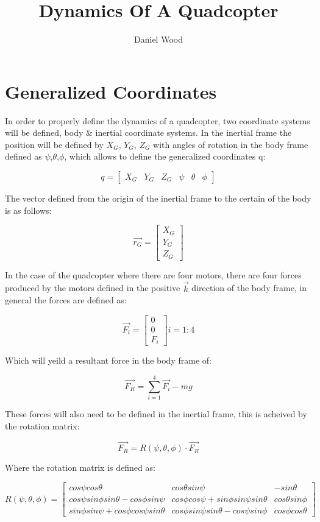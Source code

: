 \documentclass[10pt, letterpaper]{article}
\begin{document}
\title{Dynamics Of A Quadcopter}
\author{Daniel Wood}
\maketitle

\section{Generalized Coordinates}
In order to properly define the dynamics of a quadcopter, two coordinate systems will be defined, body \& inertial coordinate systems. In the inertial frame the position will be defined by $X_{G}$, $Y_{G}$, $Z_{G}$ with angles of rotation in the body frame defined as $\psi$,$\theta$,$\phi$, which allows to define the generalized coordinates q:

\[
q=[\begin{array}{cccccc}
X_{G} & Y_{G} & Z_{G} & \psi & \theta & \phi\end{array}]
\]

The vector defined from the origin of the inertial
frame to the certain of the body is as follows:

\[
\overrightarrow{r_{G}}= \left[\begin{array}{c}
X_{G}\\
Y_{G}\\
Z_{G}
\end{array}\right]
\]

In the case of the quadcopter where there are four motors, there are
four forces produced by the motors defined in the positive $\overrightarrow{k}$ direction
of the body frame, in general the forces are defined as:

\[
\overrightarrow{F_{i}}=\left[\begin{array}{c}
0\\
0\\
F_{i}
\end{array}\right]i=1:4
\]

Which will yeild a resultant force in the body frame of:

\[
\overrightarrow{F_{R}}=\sum_{i=1}^{4}\overrightarrow{F_{i}}-mg
\]

These forces will also need to be defined in the inertial frame, this
is acheived by the rotation matrix:

\[
\overrightarrow{F_{R}}=R(\psi,\theta,\phi)\cdot \overrightarrow{F_{R}}
\]

Where the rotation matrix is defined as:

\[
R(\psi,\theta,\phi)=\left[\begin{array}{ccc}
cos\psi cos\theta & cos\theta sin\psi & -sin\theta\\
cos\psi sin\phi sin\theta-cos\phi sin\psi & cos\phi cos\psi+sin\phi sin\psi sin\theta & cos\theta sin\phi\\
sin\phi sin\psi+cos\phi cos\psi sin\theta & cos\phi sin\psi sin\theta-cos\psi sin\phi & cos\phi cos\theta
\end{array}\right]
\]
\end{document}
